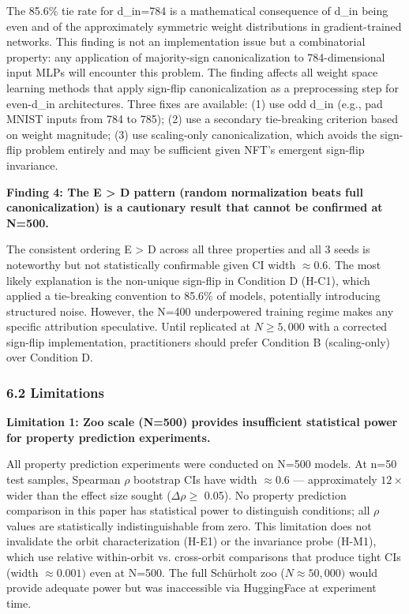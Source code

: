 The 85.6\% tie rate for d\_in=784 is a mathematical consequence of d\_in being even and of the approximately symmetric weight distributions in gradient-trained networks. This finding is not an implementation issue but a combinatorial property: any application of majority-sign canonicalization to 784-dimensional input MLPs will encounter this problem. The finding affects all weight space learning methods that apply sign-flip canonicalization as a preprocessing step for even-d\_in architectures. Three fixes are available: (1) use odd d\_in (e.g., pad MNIST inputs from 784 to 785); (2) use a secondary tie-breaking criterion based on weight magnitude; (3) use scaling-only canonicalization, which avoids the sign-flip problem entirely and may be sufficient given NFT's emergent sign-flip invariance.

\textbf{Finding 4: The E > D pattern (random normalization beats full canonicalization) is a cautionary result that cannot be confirmed at N=500.}

The consistent ordering E > D across all three properties and all 3 seeds is noteworthy but not statistically confirmable given CI width $\approx 0.6$. The most likely explanation is the non-unique sign-flip in Condition D (H-C1), which applied a tie-breaking convention to 85.6\% of models, potentially introducing structured noise. However, the N=400 underpowered training regime makes any specific attribution speculative. Until replicated at $N\geq 5,000$ with a corrected sign-flip implementation, practitioners should prefer Condition B (scaling-only) over Condition D.

\subsubsection{6.2 Limitations}

\textbf{Limitation 1: Zoo scale (N=500) provides insufficient statistical power for property prediction experiments.}

All property prediction experiments were conducted on N=500 models. At n=50 test samples, Spearman $\rho$ bootstrap CIs have width $\approx 0.6$ --- approximately $12\times$ wider than the effect size sought ($\Delta\rho \geq$ 0.05). No property prediction comparison in this paper has statistical power to distinguish conditions; all $\rho$ values are statistically indistinguishable from zero. This limitation does not invalidate the orbit characterization (H-E1) or the invariance probe (H-M1), which use relative within-orbit vs. cross-orbit comparisons that produce tight CIs (width $\approx 0.001)$ even at N=500. The full Schürholt zoo ($N\approx 50,000)$ would provide adequate power but was inaccessible via HuggingFace at experiment time.

